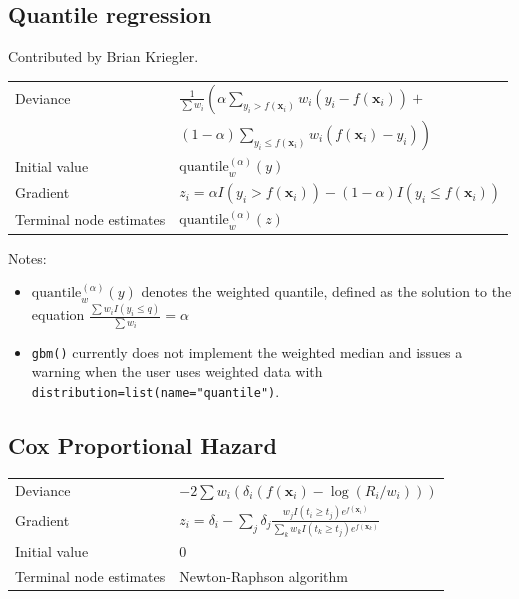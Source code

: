 \documentclass{article}
\begin{document}
\subsection{Quantile regression}

Contributed by Brian Kriegler.

\begin{tabular}{ll}
Deviance & $\frac{1}{\sum w_i}
   \left(\alpha\sum_{y_i>f(\mathbf{x}_i)} w_i(y_i-f(\mathbf{x}_i))\right. +$ \\
         & \hspace{0.5in}$\left.(1-\alpha)\sum_{y_i\leq f(\mathbf{x}_i)} w_i(f(\mathbf{x}_i)-y_i)\right)$ \\
Initial value & $\mathrm{quantile}^{(\alpha)}_w(y)$ \\
Gradient & $z_i=\alpha I(y_i>f(\mathbf{x}_i))-(1-\alpha)I(y_i\leq f(\mathbf{x}_i))$ \\
Terminal node estimates & $\mathrm{quantile}^{(\alpha)}_w(z)$
\end{tabular}

Notes:
\begin{itemize}
\item $\mathrm{quantile}^{(\alpha)}_w(y)$ denotes the weighted quantile, defined
as the solution to the equation
$\frac{\sum w_iI(y_i\leq q)}{\sum w_i}=\alpha$
\item \texttt{gbm()} currently does not implement the weighted median and
issues a warning when the user uses weighted data with
\texttt{distribution=list(name="quantile")}.
\end{itemize}


\subsection{Cox Proportional Hazard}

\begin{tabular}{ll}
Deviance & $-2\sum w_i(\delta_i(f(\mathbf{x}_i)-\log(R_i/w_i)))$\\
Gradient & $\displaystyle z_i=\delta_i - \sum_j \delta_j
            \frac{w_jI(t_i\geq t_j)e^{f(\mathbf{x}_i)}}
                 {\sum_k w_kI(t_k\geq t_j)e^{f(\mathbf{x}_k)}}$ \\
Initial value & 0 \\
Terminal node estimates & Newton-Raphson algorithm
\end{tabular}
\end{document}
